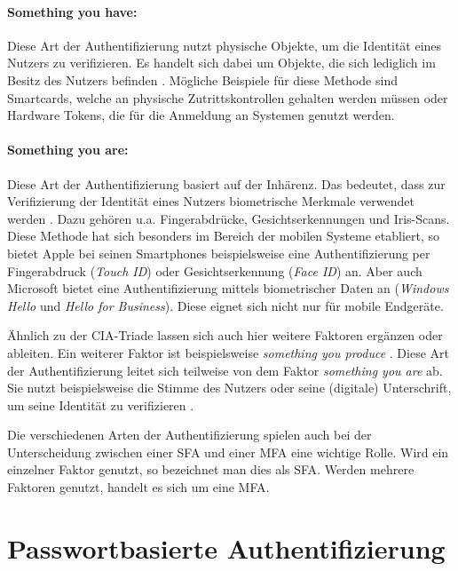 \paragraph*{Something you have:}
Diese Art der Authentifizierung nutzt physische Objekte, um die Identität eines Nutzers zu verifizieren. Es handelt sich dabei um Objekte, die sich lediglich im Besitz des Nutzers befinden \cite{boonkrong2012security}. Mögliche Beispiele für diese Methode sind Smartcards, welche an physische Zutrittskontrollen gehalten werden müssen oder Hardware Tokens, die für die Anmeldung an Systemen genutzt werden.

\paragraph*{Something you are:}
Diese Art der Authentifizierung basiert auf der Inhärenz. Das bedeutet, dass zur Verifizierung der Identität eines Nutzers biometrische Merkmale verwendet werden \cite{boonkrong2012security}. Dazu gehören u.a. Fingerabdrücke, Gesichtserkennungen und Iris-Scans. Diese Methode hat sich besonders im Bereich der mobilen Systeme etabliert, so bietet Apple bei seinen Smartphones beispielsweise eine Authentifizierung per Fingerabdruck (\textit{Touch ID}) oder Gesichtserkennung (\textit{Face ID}) an. Aber auch Microsoft bietet eine Authentifizierung mittels biometrischer Daten an (\textit{Windows Hello} und \textit{Hello for Business}). Diese eignet sich nicht nur für mobile Endgeräte.

Ähnlich zu der CIA-Triade lassen sich auch hier weitere Faktoren ergänzen oder ableiten. Ein weiterer Faktor ist beispielsweise \textit{something you produce} \cite{boonkrong2012security}. Diese Art der Authentifizierung leitet sich teilweise von dem Faktor \textit{something you are} ab. Sie nutzt beispielsweise die Stimme des Nutzers oder seine (digitale) Unterschrift, um seine Identität zu verifizieren \cite{boonkrong2012security}. 

Die verschiedenen Arten der Authentifizierung spielen auch bei der Unterscheidung zwischen einer \ac{SFA} und einer  \ac{MFA} eine wichtige Rolle. Wird ein einzelner Faktor genutzt, so bezeichnet man dies als \ac{SFA}. Werden mehrere Faktoren genutzt, handelt es sich um eine \ac{MFA}.

\section{Passwortbasierte Authentifizierung}\label{pw-auth}

